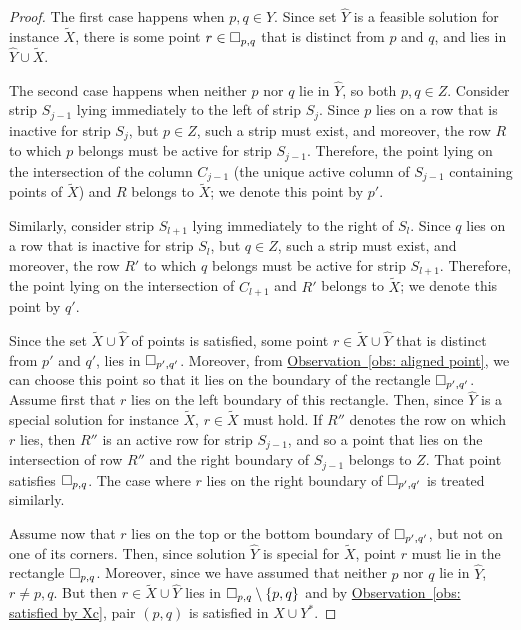 \documentclass[11pt]{article}
\numberwithin{equation}{section}
\theoremstyle{definition}
\theoremstyle{plain}
\newcommand{\expref}[2]{\hyperref[#2]{#1~\ref{#2}}}
\begin{document}
\begin{proof}
The first case happens when $p,q\in \hat Y$. Since set $\hat Y$ is a feasible solution for instance $\widetilde{X}$, there is some point $r\in \Box_{p,q}$ that is distinct from $p$ and $q$, and lies in $\hat Y\cup \widetilde{X}$. %
%


The second case happens when neither $p$ nor $q$ lie in $\hat Y$, so both $p,q\in Z$. Consider strip $S_{j-1}$ lying immediately to the left of strip $S_j$. Since $p$ lies on a row that is inactive for strip $S_j$, but $p\in Z$, such a strip must exist, and moreover, the row $R$ to which $p$ belongs must be active for strip $S_{j-1}$. Therefore, the point lying on the intersection of the column $C_{j-1}$ (the unique active column of $S_{j-1}$ containing points of $\widetilde{X}$) and $R$ belongs to $\widetilde{X}$; we denote this point by $p'$. 

Similarly, consider strip $S_{l+1}$ lying immediately to the right of $S_l$. Since $q$ lies on a row that is inactive for strip $S_l$, but $q\in Z$, such a strip must exist, and moreover, the row $R'$ to which $q$ belongs must be active for strip $S_{l+1}$. Therefore, the point lying on the intersection of $C_{l+1}$ and $R'$ belongs to $\widetilde{X}$; we denote this point by $q'$.

Since the set $\widetilde{X}\cup \hat Y$ of points is satisfied, some point $r\in \widetilde{X}\cup \hat Y$ that is distinct from $p'$ and $q'$, lies in $\Box_{p',q'}$. Moreover, from \expref{Observation}{obs: aligned point}, we can choose this point so that it lies on the boundary of the rectangle $\Box_{p',q'}$. Assume first that $r$ lies on the left boundary of this rectangle. Then, since $\hat Y$ is a special solution for instance $\widetilde{X}$, $r\in \widetilde{X}$ must hold. If $R''$ denotes the row on which $r$ lies, then $R''$ is an active row for strip $S_{j-1}$, and so a point that lies on the intersection of row $R''$ and the right boundary of $S_{j-1}$ belongs to $Z$. That point satisfies $\Box_{p,q}$. The case where $r$ lies on the right boundary of $\Box_{p',q'}$ is treated similarly.

Assume now that $r$ lies on the top or the bottom boundary of $\Box_{p',q'}$, but not on one of its corners. Then, since solution $\hat Y$ is special for $\widetilde{X}$, point $r$ must lie in the rectangle $\Box_{p,q}$. Moreover, since we have assumed that neither $p$ nor $q$ lie in $\hat Y$, $r\neq p,q$. But then $r\in \widetilde{X}\cup \hat Y$ lies in $\Box_{p,q}\setminus\left\{ p,q \right\}$ and by \expref{Observation}{obs: satisfied by Xc}, pair $(p,q)$ is satisfied in $X\cup Y^*$.




\end{proof}
\end{document}
